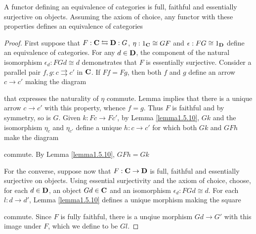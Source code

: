 \documentclass[11pt]{article}
\begin{document}
\begin{theorem}
\label{thm1.5.9}
A functor defining an equivalence of categories is full, faithful and essentially surjective on
objects. Assuming the axiom of choice, any functor with these properties defines an equivalence
of categories
\end{theorem}

\begin{proof}
First suppose that \(F:\operatorname{\textbf{C}}\leftrightarrows\operatorname{\textbf{D}}:G\), \(\eta:1_{\operatorname{\textbf{C}}}\cong GF\) and \(\epsilon:FG\cong 1_{\operatorname{\textbf{D}}}\) define an
equivalence of categories. For any \(d\in\operatorname{\textbf{D}}\), the component of the natural
isomorphism \(\epsilon_d:FGd\cong d\) demonstrates that \(F\) is essentially surjective. Consider a
parallel pair \(f,g:c\rightrightarrows c'\) in \(\operatorname{\textbf{C}}\). If \(Ff=Fg\), then both \(f\) and \(g\)
define an arrow \(c\to c'\) making the diagram
\begin{center}\end{center}
that expresses the naturality of \(\eta\) commute. Lemma implies that there is a unique arrow \(c\to c'\)
with this property, whence \(f=g\). Thus \(F\) is faithful and by symmetry, so is \(G\).
Given \(k:Fc\to Fc'\), by Lemma \ref{lemma1.5.10}, \(Gk\) and the isomorphism \(\eta_c\) and \(\eta_{c'}\)
define a unique \(h:c\to c'\) for which both \(Gk\) and \(GFh\) make the diagram
\begin{center}\end{center}
commute. By Lemma \ref{lemma1.5.10}, \(GFh=Gk\)

For the converse, suppose now that \(F:\operatorname{\textbf{C}}\to\operatorname{\textbf{D}}\) is full, faithful and essentially surjective on
objects. Using essential surjectivity and the axiom of choice, choose, for each \(d\in\operatorname{\textbf{D}}\), an
object \(Gd\in\operatorname{\textbf{C}}\) and an isomorphism \(\epsilon_d:FGd\cong d\). For each \(l:d\to d'\), Lemma \ref{lemma1.5.10}
defines a unique morphism making the square
\begin{center}\end{center}
commute. Since \(F\) is fully faithful, there is a unqiue morphism \(Gd\to G'\) with this image
under \(F\), which we define to be \(Gl\).
\end{proof}
\end{document}
